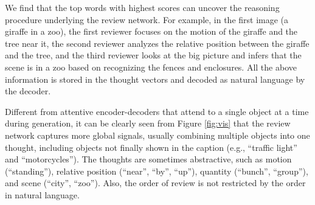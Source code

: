 \documentclass{article}
\begin{document}
We find that the top words with highest scores can uncover the reasoning procedure underlying the review network. For example, in the first image (a giraffe in a zoo), the first reviewer focuses on the motion of the giraffe and the tree near it, the second reviewer analyzes the relative position between the giraffe and the tree, and the third reviewer looks at the big picture and infers that the scene is in a zoo based on recognizing the fences and enclosures. All the above information is stored in the thought vectors and decoded as natural language by the decoder.

Different from attentive encoder-decoders \cite{xu2015show} that attend to a single object at a time during generation, it can be clearly seen from Figure \ref{fig:vis} that the review network captures more global signals, usually combining multiple objects into one thought, including objects not finally shown in the caption (e.g., ``traffic light'' and ``motorcycles''). The thoughts are sometimes abstractive, such as motion (``standing''), relative position (``near'', ``by'', ``up''), quantity (``bunch'', ``group''), and scene (``city'', ``zoo''). Also, the order of review is not restricted by the order in natural language.

\end{document}
